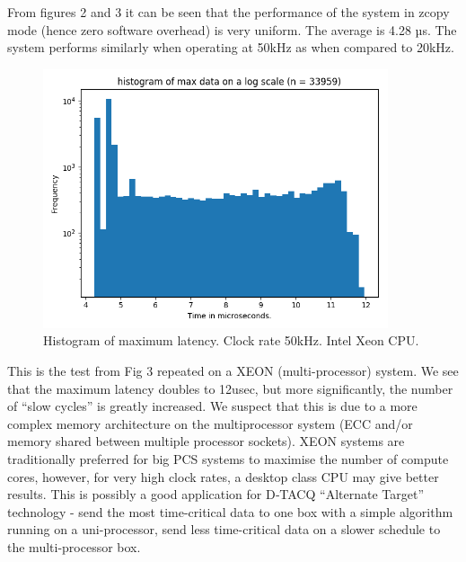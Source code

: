 \documentclass{article}
\begin{document}
From figures 2 and 3 it can be seen that the performance of the system in zcopy mode (hence zero software overhead) is very uniform.
The average is 4.28 µs.
The system performs similarly when operating at 50kHz as when compared to 20kHz. 

\begin{figure}
	\centering
	\includegraphics[width=4.0in]{images/50kHz_xeon.png}
	\caption{Histogram of maximum latency. Clock rate 50kHz. Intel Xeon CPU.}
	\label{xeon50}
\end{figure}

This is the test from Fig 3 repeated on a XEON (multi-processor) system.
We see that the maximum latency doubles to 12usec, but more significantly, the number of “slow cycles” is greatly increased.
We suspect that this is due to a more complex memory architecture on the multiprocessor system (ECC and/or memory shared between multiple processor sockets).
XEON systems are traditionally preferred for big PCS systems to maximise the number of compute cores, however, for very high clock rates, a desktop class CPU may give better results.
This is possibly a good application for D‑TACQ “Alternate Target” technology - send the most time-critical data to one box with a simple algorithm running on a uni-processor, send less time-critical data on a slower schedule to the multi-processor box.
\end{document}
